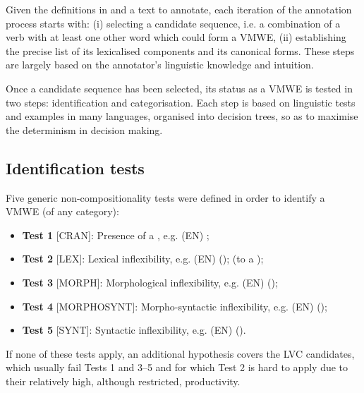 \documentclass[output=paper,
modfonts,
]{langscibook}
\begin{document}
Given the definitions in   and a text to annotate, each iteration of the annotation process starts with: (i) selecting a candidate sequence, i.e. a combination of a verb  with at least one other word which could form a VMWE, (ii) establishing the precise list of its lexicalised components and its canonical forms. These steps are largely based on the annotator's linguistic knowledge and intuition.

Once a candidate sequence has been selected, its status as a VMWE is tested in two steps: identification and categorisation. Each step is based on linguistic tests and examples in many languages, organised into decision trees, so as to maximise the determinism in decision making. 

%

\subsection{Identification tests}
\label{sec:identify}
%
Five generic non-compositionality tests were defined in order to identify a VMWE (of any category):
\begin{itemize}
\item[]\label{test:cran}\textbf{Test 1} [CRAN]: Presence of a , e.g. (EN) ; 
\item[]\label{test:lex}\textbf{Test 2} [LEX]: Lexical inflexibility, e.g. (EN)  ();  (\ile to { a }); 
\item[]\label{test:morph}\textbf{Test 3} [MORPH]: Morphological inflexibility, e.g. (EN)  (); 
\item[]\label{test:morphosynt}\textbf{Test 4} [MORPHOSYNT]: Morpho-syntactic inflexibility, e.g. (EN)  (); 
\item[]\label{test:synt}\textbf{Test 5} [SYNT]: Syntactic inflexibility, e.g. (EN)  ().
\end{itemize}
If none of these tests apply, an additional hypothesis covers the %
LVC candidates, which usually fail Tests 1 %
and 3--5 
and for which Test 2 %
is hard to apply due to their relatively high, although restricted, productivity. 
\end{document}
